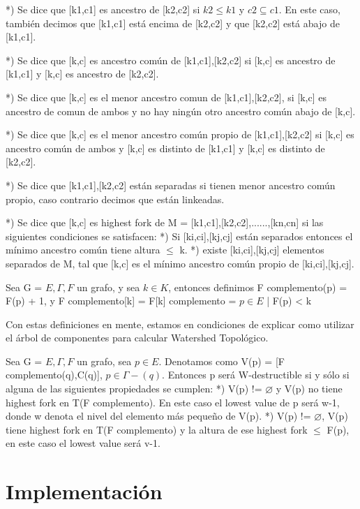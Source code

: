   *) Se dice que [k1,c1] es ancestro de [k2,c2] si \(k2 \le k1\) y \(c2 \subseteq c1\). En este
caso, también decimos que [k1,c1] está encima de [k2,c2] y que [k2,c2] está
abajo de [k1,c1].

  *) Se dice que [k,c] es ancestro común de [k1,c1],[k2,c2] si [k,c] es ancestro
de [k1,c1] y [k,c] es ancestro de [k2,c2].

  *) Se dice que [k,c] es el menor ancestro comun de [k1,c1],[k2,c2], si [k,c]
es ancestro de comun de ambos y no hay ningún otro ancestro común abajo de
[k,c].

  *) Se dice que [k,c] es el menor ancestro común propio de [k1,c1],[k2,c2] si
[k,c] es ancestro común de ambos y [k,c] es distinto de [k1,c1] y [k,c] es
distinto de [k2,c2].

  *) Se dice que [k1,c1],[k2,c2] están separadas si tienen menor ancestro común
propio, caso contrario decimos que están linkeadas.

  *) Se dice que [k,c] es highest fork de M = {[k1,c1],[k2,c2],......,[kn,cn]}
si las siguientes condiciones se satisfacen:
    *) Si [ki,ci],[kj,cj] están separados entonces el mínimo ancestro común
tiene altura \(\le\) k.
    *) existe [ki,ci],[kj,cj] elementos separados de M, tal que [k,c] es el
mínimo ancestro común propio de [ki,ci],[kj,cj]. 

Sea G = \(E,\Gamma,F\) un grafo, y sea \(k \in K\), entonces definimos F complemento(p) = F(p) + 1, y F complemento[k] = F[k] complemento = { \(p \in E\) | F(p) < k }
 
Con estas definiciones en mente, estamos en condiciones de explicar como utilizar el árbol de componentes para calcular Watershed Topológico.

Sea  G = \(E,\Gamma,F\)  un grafo, sea \(p \in E\). Denotamos como V(p) = {[F complemento(q),C(q)], \(p \in \Gamma-(q)\)}. Entonces p será W-destructible si y sólo si alguna de las siguientes propiedades se cumplen: 
  *) V(p) != \(\varnothing\) y V(p) no tiene highest fork en T(F complemento). En este caso el lowest value de p será w-1, donde w denota el nivel del elemento más pequeño de V(p).
  *) V(p) != \(\varnothing\), V(p) tiene highest fork en T(F complemento) y la altura de ese highest fork \(\leq\) F(p), en este caso el lowest value será v-1.

\section{Implementación}

